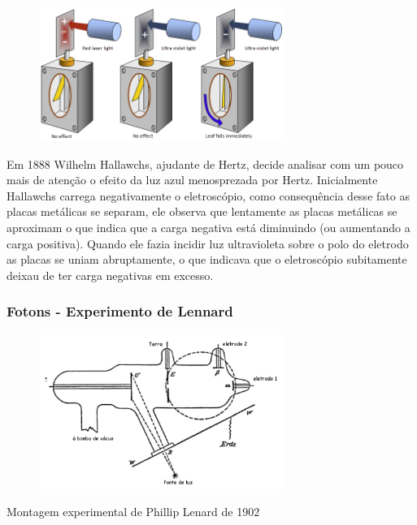 \documentclass[12pt,brazil]{beamer}
\begin{document}
\begin{frame}


        \begin{figure}
          \includegraphics[width=8cm]{figuras/fig13}
        \end{figure}
        \fontsize{10pt}{11pt}\selectfont

  Em 1888 Wilhelm Hallawchs, ajudante de Hertz, decide analisar com um pouco mais de atenção o efeito da luz azul menosprezada por Hertz. Inicialmente Hallawchs carrega negativamente o eletroscópio, como consequência desse fato as placas metálicas se separam, ele observa que lentamente as placas metálicas se aproximam o que indica que a carga negativa está diminuindo (ou aumentando a carga positiva). Quando ele fazia incidir luz ultravioleta sobre o polo do eletrodo as placas se uniam abruptamente, o que indicava que o eletroscópio subitamente deixau de ter carga negativas em excesso.

\end{frame}



\begin{frame}
  \frametitle{Fotons - Experimento de Lennard}

  \begin{figure}
          \includegraphics[width=8cm]{figuras/fig14}
  \end{figure}
  
  Montagem experimental de Phillip Lenard de 1902

\end{frame}
\end{document}
